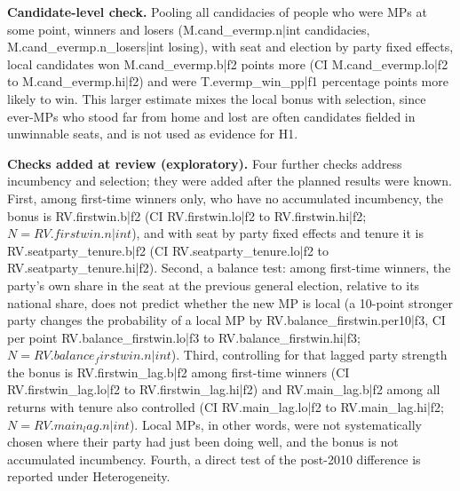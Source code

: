 \documentclass[11pt,a4paper]{article}
\begin{document}
\textbf{Candidate-level check.} Pooling all candidacies of people who were MPs at some point, winners and losers ({{M.cand_evermp.n|int}} candidacies, {{M.cand_evermp.n_losers|int}} losing), with seat and election by party fixed effects, local candidates won {{M.cand_evermp.b|f2}} points more (CI {{M.cand_evermp.lo|f2}} to {{M.cand_evermp.hi|f2}}) and were {{T.evermp_win_pp|f1}} percentage points more likely to win. This larger estimate mixes the local bonus with selection, since ever-MPs who stood far from home and lost are often candidates fielded in unwinnable seats, and is not used as evidence for H1.

\textbf{Checks added at review (exploratory).} Four further checks address incumbency and selection; they were added after the planned results were known. First, among first-time winners only, who have no accumulated incumbency, the bonus is {{RV.firstwin.b|f2}} (CI {{RV.firstwin.lo|f2}} to {{RV.firstwin.hi|f2}}; $N={{RV.firstwin.n|int}}$), and with seat by party fixed effects and tenure it is {{RV.seatparty_tenure.b|f2}} (CI {{RV.seatparty_tenure.lo|f2}} to {{RV.seatparty_tenure.hi|f2}}). Second, a balance test: among first-time winners, the party's own share in the seat at the previous general election, relative to its national share, does not predict whether the new MP is local (a 10-point stronger party changes the probability of a local MP by {{RV.balance_firstwin.per10|f3}}, CI per point {{RV.balance_firstwin.lo|f3}} to {{RV.balance_firstwin.hi|f3}}; $N={{RV.balance_firstwin.n|int}}$). Third, controlling for that lagged party strength the bonus is {{RV.firstwin_lag.b|f2}} among first-time winners (CI {{RV.firstwin_lag.lo|f2}} to {{RV.firstwin_lag.hi|f2}}) and {{RV.main_lag.b|f2}} among all returns with tenure also controlled (CI {{RV.main_lag.lo|f2}} to {{RV.main_lag.hi|f2}}; $N={{RV.main_lag.n|int}}$). Local MPs, in other words, were not systematically chosen where their party had just been doing well, and the bonus is not accumulated incumbency. Fourth, a direct test of the post-2010 difference is reported under Heterogeneity.
\end{document}
